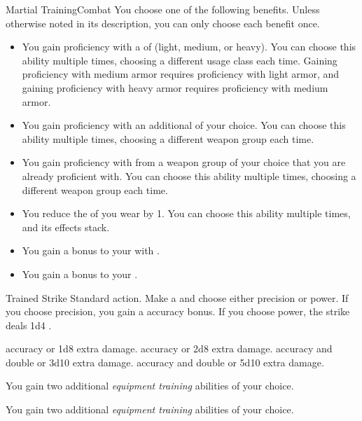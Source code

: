   \begin{feat}{Martial Training}{Combat}
     You choose one of the following benefits.
    Unless otherwise noted in its description, you can only choose each benefit once.
    \begin{itemize}
      \item You gain proficiency with a  of  (light, medium, or heavy).
        You can choose this ability multiple times, choosing a different usage class each time.
        Gaining proficiency with medium armor requires proficiency with light armor, and gaining proficiency with heavy armor requires proficiency with medium armor.
      \item You gain proficiency with an additional  of your choice.
        You can choose this ability multiple times, choosing a different weapon group each time.
      \item You gain proficiency with  from a weapon group of your choice that you are already proficient with.
        You can choose this ability multiple times, choosing a different weapon group each time.
      \item You reduce the  of  you wear by 1.
        You can choose this ability multiple times, and its effects stack.
      \item You gain a  bonus to your  with .
      \item You gain a  bonus to your .
    \end{itemize}

    \begin{activeability}{Trained Strike}
      \abilityusagetime Standard action.
      \rankline
      Make a  and choose either precision or power.
      If you choose precision, you gain a  accuracy bonus.
      If you choose power, the strike deals 1d4 .

      \rankline
        accuracy or 1d8 extra damage.
        accuracy or 2d8 extra damage.
        accuracy and double  or 3d10 extra damage.
        accuracy and double  or 5d10 extra damage.
    \end{activeability}

     You gain two additional \textit{equipment training} abilities of your choice.

     You gain two additional \textit{equipment training} abilities of your choice.
  \end{feat}

